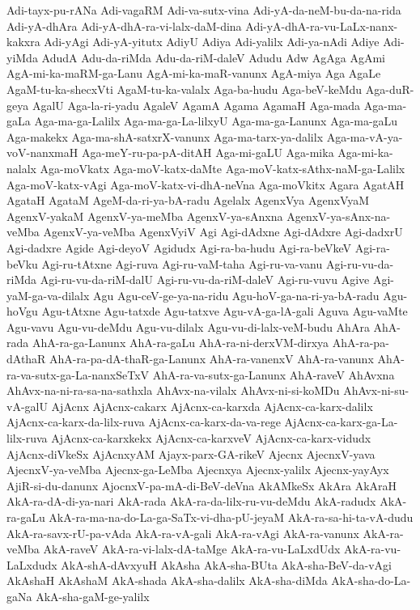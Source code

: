 {Adi-tayx-pu-rANa
Adi-vagaRM
Adi-va-sutx-vina
Adi-yA-da-neM-bu-da-na-rida
Adi-yA-dhAra
Adi-yA-dhA-ra-vi-lalx-daM-dina
Adi-yA-dhA-ra-vu-LaLx-nanx-kakxra
Adi-yAgi
Adi-yA-yitutx
AdiyU
Adiya
Adi-yalilx
Adi-ya-nAdi
Adiye
Adi-yiMda
AdudA
Adu-da-riMda
Adu-da-riM-daleV
Adudu
Adw
AgAga
AgAmi
AgA-mi-ka-maRM-ga-Lanu
AgA-mi-ka-maR-vanunx
AgA-miya
Aga
AgaLe
AgaM-tu-ka-shecxVti
AgaM-tu-ka-valalx
Aga-ba-hudu
Aga-beV-keMdu
Aga-duR-geya
AgalU
Aga-la-ri-yadu
AgaleV
AgamA
Agama
AgamaH
Aga-mada
Aga-ma-gaLa
Aga-ma-ga-Lalilx
Aga-ma-ga-La-lilxyU
Aga-ma-ga-Lanunx
Aga-ma-gaLu
Aga-makekx
Aga-ma-shA-satxrX-vanunx
Aga-ma-tarx-ya-dalilx
Aga-ma-vA-ya-voV-nanxmaH
Aga-meY-ru-pa-pA-ditAH
Aga-mi-gaLU
Aga-mika
Aga-mi-ka-nalalx
Aga-moVkatx
Aga-moV-katx-daMte
Aga-moV-katx-sAthx-naM-ga-Lalilx
Aga-moV-katx-vAgi
Aga-moV-katx-vi-dhA-neVna
Aga-moVkitx
Agara
AgatAH
AgataH
AgataM
AgeM-da-ri-ya-bA-radu
Agelalx
AgenxVya
AgenxVyaM
AgenxV-yakaM
AgenxV-ya-meMba
AgenxV-ya-sAnxna
AgenxV-ya-sAnx-na-veMba
AgenxV-ya-veMba
AgenxVyiV
Agi
Agi-dAdxne
Agi-dAdxre
Agi-dadxrU
Agi-dadxre
Agide
Agi-deyoV
Agidudx
Agi-ra-ba-hudu
Agi-ra-beVkeV
Agi-ra-beVku
Agi-ru-tAtxne
Agi-ruva
Agi-ru-vaM-taha
Agi-ru-va-vanu
Agi-ru-vu-da-riMda
Agi-ru-vu-da-riM-dalU
Agi-ru-vu-da-riM-daleV
Agi-ru-vuvu
Agive
Agi-yaM-ga-va-dilalx
Agu
Agu-ceV-ge-ya-na-ridu
Agu-hoV-ga-na-ri-ya-bA-radu
Agu-hoVgu
Agu-tAtxne
Agu-tatxde
Agu-tatxve
Agu-vA-ga-lA-gali
Aguva
Agu-vaMte
Agu-vavu
Agu-vu-deMdu
Agu-vu-dilalx
Agu-vu-di-lalx-veM-budu
AhAra
AhA-rada
AhA-ra-ga-Lanunx
AhA-ra-gaLu
AhA-ra-ni-derxVM-dirxya
AhA-ra-pa-dAthaR
AhA-ra-pa-dA-thaR-ga-Lanunx
AhA-ra-vanenxV
AhA-ra-vanunx
AhA-ra-va-sutx-ga-La-nanxSeTxV
AhA-ra-va-sutx-ga-Lanunx
AhA-raveV
AhAvxna
AhAvx-na-ni-ra-sa-na-sathxla
AhAvx-na-vilalx
AhAvx-ni-si-koMDu
AhAvx-ni-su-vA-galU
AjAcnx
AjAcnx-cakarx
AjAcnx-ca-karxda
AjAcnx-ca-karx-dalilx
AjAcnx-ca-karx-da-lilx-ruva
AjAcnx-ca-karx-da-va-rege
AjAcnx-ca-karx-ga-La-lilx-ruva
AjAcnx-ca-karxkekx
AjAcnx-ca-karxveV
AjAcnx-ca-karx-vidudx
AjAcnx-diVkeSx
AjAcnxyAM
Ajayx-parx-GA-rikeV
Ajecnx
AjecnxV-yava
AjecnxV-ya-veMba
Ajecnx-ga-LeMba
Ajecnxya
Ajecnx-yalilx
Ajecnx-yayAyx
AjiR-si-du-danunx
AjocnxV-pa-mA-di-BeV-deVna
AkAMkeSx
AkAra
AkAraH
AkA-ra-dA-di-ya-nari
AkA-rada
AkA-ra-da-lilx-ru-vu-deMdu
AkA-radudx
AkA-ra-gaLu
AkA-ra-ma-na-do-La-ga-SaTx-vi-dha-pU-jeyaM
AkA-ra-sa-hi-ta-vA-dudu
AkA-ra-savx-rU-pa-vAda
AkA-ra-vA-gali
AkA-ra-vAgi
AkA-ra-vanunx
AkA-ra-veMba
AkA-raveV
AkA-ra-vi-lalx-dA-taMge
AkA-ra-vu-LaLxdUdx
AkA-ra-vu-LaLxdudx
AkA-shA-dAvxyuH
AkAsha
AkA-sha-BUta
AkA-sha-BeV-da-vAgi
AkAshaH
AkAshaM
AkA-shada
AkA-sha-dalilx
AkA-sha-diMda
AkA-sha-do-La-gaNa
AkA-sha-gaM-ge-yalilx
}
